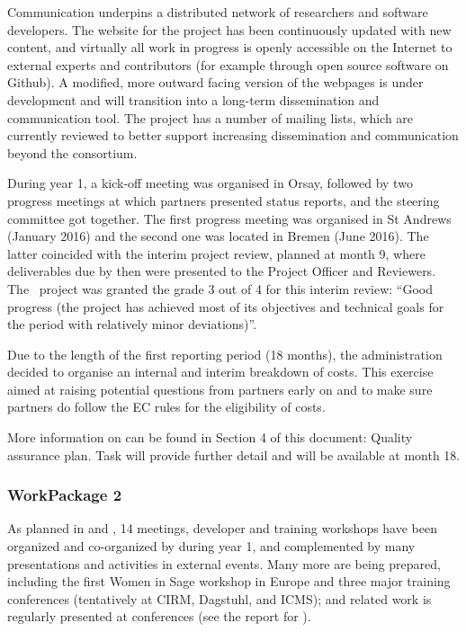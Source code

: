 \documentclass{deliverablereport}
\begin{document}
Communication underpins a distributed network of researchers and
software developers. The website for the project has been continuously
updated with new content, and virtually all work in progress is openly
accessible on the Internet to external experts and contributors (for
example through open source software on Github). A modified, more
outward facing version of the webpages is under development and will
transition into a long-term dissemination and communication tool.
The project has a number of mailing lists, which are currently
reviewed to better support increasing dissemination and communication
beyond the consortium.

During year 1, a kick-off meeting was organised in Orsay, followed by
two progress meetings at which partners presented status reports, and
the steering committee got together.  The first progress meeting was
organised in St Andrews (January 2016) and the second one was located
in Bremen (June 2016).  The latter coincided with the interim project
review, planned at month 9, where deliverables due by then were
presented to the Project Officer and Reviewers. The \ODK\ project was
granted the grade 3 out of 4 for this interim review: ``Good progress
(the project has achieved most of its objectives and technical goals
for the period with relatively minor deviations)''.

Due to the length of the first reporting period (18 months), the
 administration decided to organise an internal and interim
breakdown of costs. This exercise aimed at raising potential questions
from partners early on and to make sure partners do follow the EC
rules for the eligibility of costs.

More information on
 can be found in
Section 4 of this document: Quality assurance plan.
Task  will provide
further detail and will be available at month 18.


\subsubsection{WorkPackage 2}

As planned in  and
, 14 meetings, developer and
training workshops have been organized and co-organized by \ODK during
year 1, and complemented by many presentations and activities in
external events.  Many more are being prepared, including the first
Women in Sage workshop in Europe and three major training conferences
(tentatively at CIRM, Dagstuhl, and ICMS); \ODK and \ODK related work
is regularly presented at conferences (see the report for
).
\end{document}
